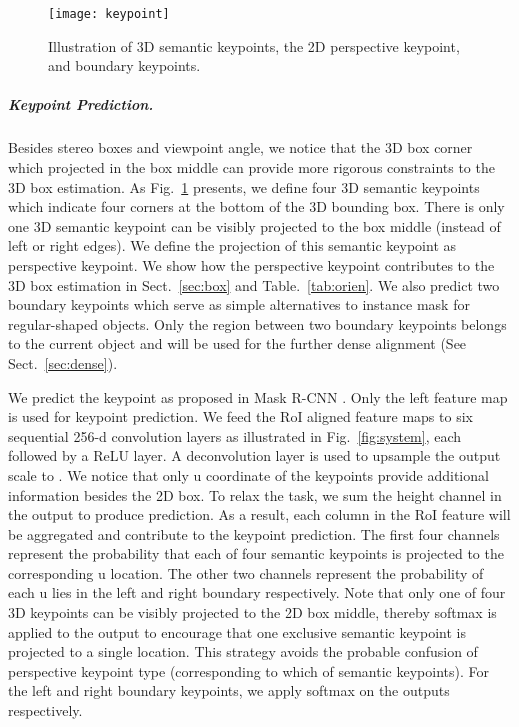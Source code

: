 \documentclass[10pt,twocolumn,letterpaper]{article}
\begin{document}
	\begin{figure}
		\begin{center}
			\texttt{[image: keypoint]}
		\end{center}
		\caption{Illustration of 3D semantic keypoints, the 2D perspective keypoint, and boundary keypoints.}
		\label{fig:keypoint}
	\end{figure}
	{\setlength{\parindent}{0cm}
		\subparagraph*{Keypoint Prediction.}
		\label{sec:keypoint}
		Besides stereo boxes and viewpoint angle, we notice that the 3D box corner which projected in the box middle can provide more rigorous constraints to the 3D box estimation. As Fig.~\ref{fig:keypoint} presents, we define four 3D semantic keypoints which indicate four corners at the bottom of the 3D bounding box. There is only one 3D semantic keypoint can be visibly projected to the box middle (instead of left or right edges). We define the projection of this semantic keypoint as perspective keypoint. We show how the perspective keypoint contributes to the 3D box estimation in Sect.~\ref{sec:box} and Table.~\ref{tab:orien}. We also predict two boundary keypoints which serve as simple alternatives to instance mask for regular-shaped objects. Only the region between two boundary keypoints belongs to the current object and will be used for the further dense alignment (See Sect.~\ref{sec:dense}). 
	}
	
	We predict the keypoint as proposed in Mask R-CNN \cite{he2017mask}. Only the left feature map is used for keypoint prediction. We feed the  RoI aligned feature maps to six sequential 256-d  convolution layers as illustrated in Fig.~\ref{fig:system}, each followed by a ReLU layer. A  deconvolution layer is used to upsample the output scale to . We notice that only u coordinate of the keypoints provide additional information besides the 2D box.
	To relax the task, we sum the height channel in the  output to produce  prediction. As a result, each column in the RoI feature will be aggregated and contribute to the keypoint prediction. The first four channels represent the probability that each of four semantic keypoints is projected to the corresponding u location. The other two channels represent the probability of each u lies in the left and right boundary respectively.
	Note that only one of four 3D keypoints can be visibly projected to the 2D box middle, thereby softmax is applied to the   output to encourage that one exclusive semantic keypoint is projected to a single location. This strategy avoids the probable confusion of perspective keypoint type (corresponding to which of semantic keypoints). For the left and right boundary keypoints, we apply softmax on the  outputs respectively.
\end{document}
